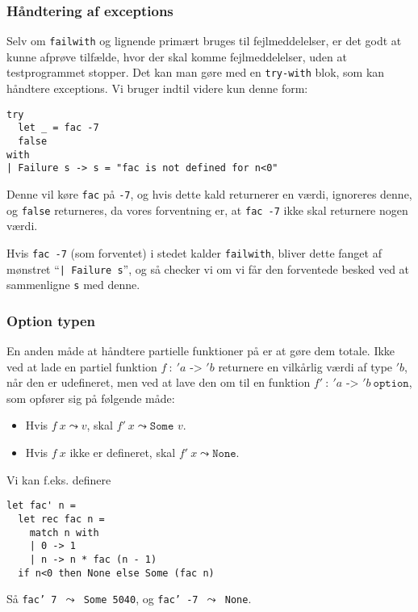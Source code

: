 \documentclass{beamer}
\begin{document}
\begin{frame}[fragile=singleslide]
\frametitle{Håndtering af exceptions}

Selv om \texttt{failwith} og lignende primært bruges til
fejlmeddelelser, er det godt at kunne afprøve tilfælde, hvor der skal
komme fejlmeddelelser, uden at testprogrammet stopper.  Det kan man
gøre med en \texttt{try-with} blok, som kan håndtere exceptions.  Vi
bruger indtil videre kun denne form:

\begin{verbatim}
try
  let _ = fac -7
  false
with
| Failure s -> s = "fac is not defined for n<0"
\end{verbatim}

Denne vil køre \texttt{fac} på \texttt{-7}, og hvis dette kald returnerer
en værdi, ignoreres denne, og \texttt{false} returneres, da vores
forventning er, at \texttt{fac -7} ikke skal returnere nogen værdi.

Hvis \texttt{fac -7} (som forventet) i stedet kalder
\texttt{failwith}, bliver dette fanget af mønstret
``\texttt{|~Failure~s}'', og så checker vi om vi får den forventede besked
ved at sammenligne \texttt{s} med denne.

\end{frame}

\begin{frame}[fragile=singleslide]
\frametitle{Option typen}

En anden måde at håndtere partielle funktioner på er at gøre dem
totale.
Ikke ved at lade en partiel funktion $f~:~ 'a \texttt{ -> } 'b$
returnere en vilkårlig værdi af type $'b$, når den er udefineret, men
ved at lave den om til en funktion $f'~:~ 'a \texttt{ -> }
'b\ \texttt{option}$, som opfører sig på følgende måde:

\begin{itemize}
\item Hvis $f~x \leadsto v$, skal $f'~x \leadsto \texttt{Some }v$.
\item  Hvis $f~x$ ikke er defineret, skal $f'~x \leadsto \texttt{None}$.
\end{itemize}

Vi kan f.eks. definere

\begin{verbatim}
let fac' n =
  let rec fac n =
    match n with
    | 0 -> 1
    | n -> n * fac (n - 1)
  if n<0 then None else Some (fac n)
\end{verbatim}

Så \texttt{fac' 7 $\leadsto$ Some 5040}, og \texttt{fac' -7 $\leadsto$ None}.

\end{frame}
\end{document}
